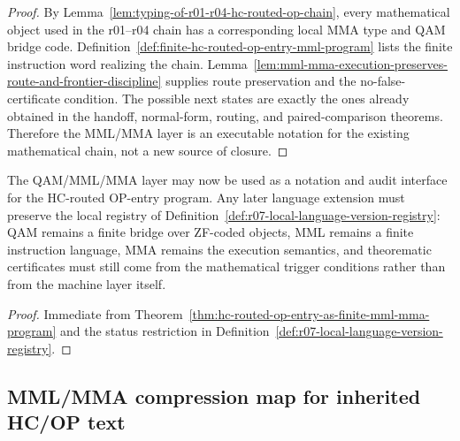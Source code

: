 \begin{proof}
By Lemma~\ref{lem:typing-of-r01-r04-hc-routed-op-chain}, every mathematical object used in the r01--r04 chain has a corresponding local MMA type and QAM bridge code. Definition~\ref{def:finite-hc-routed-op-entry-mml-program} lists the finite instruction word realizing the chain. Lemma~\ref{lem:mml-mma-execution-preserves-route-and-frontier-discipline} supplies route preservation and the no-false-certificate condition. The possible next states are exactly the ones already obtained in the handoff, normal-form, routing, and paired-comparison theorems. Therefore the MML/MMA layer is an executable notation for the existing mathematical chain, not a new source of closure.
\end{proof}

\begin{corollary}
\label{cor:v3340-r07-working-rule}
The QAM/MML/MMA layer may now be used as a notation and audit interface for the HC-routed OP-entry program. Any later language extension must preserve the local registry of Definition~\ref{def:r07-local-language-version-registry}: QAM remains a finite bridge over ZF-coded objects, MML remains a finite instruction language, MMA remains the execution semantics, and theorematic certificates must still come from the mathematical trigger conditions rather than from the machine layer itself.
\end{corollary}

\begin{proof}
Immediate from Theorem~\ref{thm:hc-routed-op-entry-as-finite-mml-mma-program} and the status restriction in Definition~\ref{def:r07-local-language-version-registry}.
\end{proof}


\subsection{MML/MMA compression map for inherited HC/OP text}
\label{subsec:mml-mma-compression-map-for-inherited-hcop-text}

